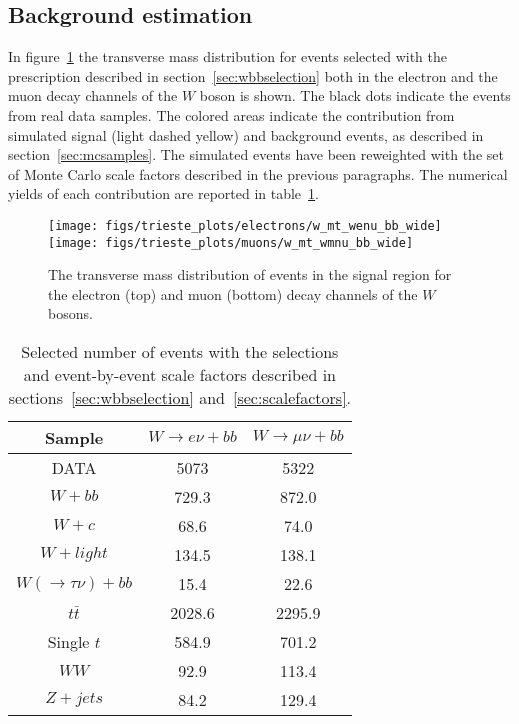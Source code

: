 \subsection{Background estimation}
\label{sec:backgrounds}

In figure~\ref{fig:transvMassPrefit} the transverse mass distribution for events 
selected with the prescription described in section~\ref{sec:wbbselection} both 
in the electron and the muon decay channels of the $W$ boson is shown.
The black dots indicate the events from real data samples. The colored areas indicate 
the contribution from simulated signal (light dashed yellow) and 
background events, as described in section~\ref{sec:mcsamples}.
The simulated events have been reweighted with the set of Monte Carlo scale factors 
described in the previous paragraphs.
The numerical yields of each contribution are reported in table~\ref{tab:yieldsPrefit}.

\begin{figure}[htb]
	\begin{center}
		\leavevmode
		\texttt{[image: figs/trieste\_plots/electrons/w\_mt\_wenu\_bb\_wide]}
		\texttt{[image: figs/trieste\_plots/muons/w\_mt\_wmnu\_bb\_wide]}
	\end{center}
	\caption{The transverse mass distribution of events in the signal region for the 
        electron (top) and muon (bottom) decay channels of the $W$ bosons.}
	\label{fig:transvMassPrefit}
\end{figure}


\begin{table}[htb]
\begin{center}
\begin{tabular}{|c|c|c|}
\hline
\textbf{Sample} & $W \rightarrow e \nu + bb$ & $W \rightarrow \mu \nu + bb$ \\ 
\hline
DATA        & 5073   & 5322 \\
\hline             
$W + bb$    & 729.3  & 872.0 \\
$W + c$     & 68.6   & 74.0 \\
$W + light$ & 134.5  & 138.1 \\
$W(\rightarrow \tau \nu) + bb$  & 15.4 & 22.6 \\
$t\bar{t}$  & 2028.6 & 2295.9 \\
Single $t$  & 584.9  & 701.2 \\
$WW$        & 92.9   & 113.4 \\
$Z + jets$  & 84.2   & 129.4 \\
\hline
\end{tabular}
\end{center}
\caption{Selected number of events with the selections and event-by-event scale factors
  described in sections~\ref{sec:wbbselection} and~\ref{sec:scalefactors}.} 
\label{tab:yieldsPrefit}
\end{table}



